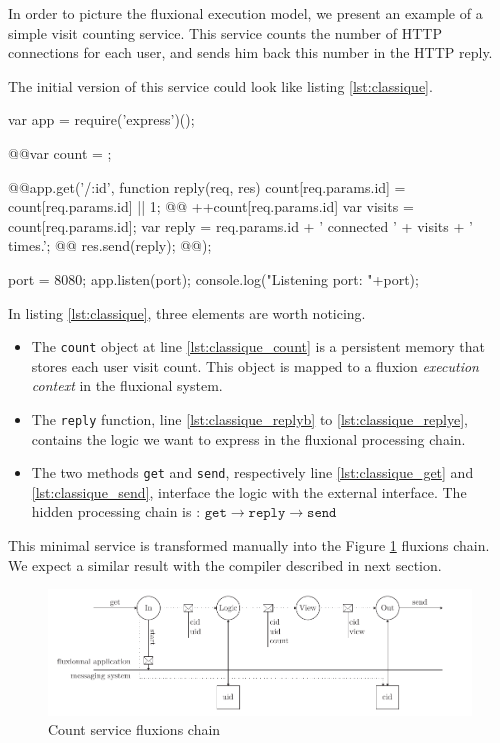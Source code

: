 In order to picture the fluxional execution model, we present an example of a simple visit counting service.
This service counts the number of HTTP connections for each user, and sends him back this number in the HTTP reply.

The initial version of this service could look like listing \ref{lst:classique}.

\begin{code}[Javascript, caption={Initial service},label={lst:classique}]
var app = require('express')();

@\label{lst:classique_count}@var count = {};

@\label{lst:classique_get}\label{lst:classique_replyb}@app.get('/:id', function reply(req, res){
  count[req.params.id] = count[req.params.id]  || 1; @\label{lst:classique_dynres}@
  ++count[req.params.id] 
  var visits = count[req.params.id];
  var reply = req.params.id + ' connected ' + visits + ' times.';
@\label{lst:classique_send}@  res.send(reply);
@\label{lst:classique_replye}@});

port = 8080;
app.listen(port);
console.log("Listening port: "+port);
\end{code}

In listing \ref{lst:classique}, three elements are worth noticing.

\begin{itemize}
  \item The \texttt{count} object at line \ref{lst:classique_count} is a persistent memory that stores each user visit count.
  This object is mapped to a fluxion \textit{execution context} in the fluxional system.
  \item The \texttt{reply} function, line \ref{lst:classique_replyb} to \ref{lst:classique_replye}, contains the logic we want to express in the fluxional processing chain.
  \item The two methods \texttt{get} and \texttt{send}, respectively line \ref{lst:classique_get} and \ref{lst:classique_send}, interface the logic with the external interface.
  The hidden processing chain is : $\texttt{get} \to \texttt{reply} \to \texttt{send}$
\end{itemize}

This minimal service is transformed manually into the Figure \ref{fig:fluxions} fluxions chain.
We expect a similar result with the compiler described in next section. 

\begin{figure}[h!]
  \includegraphics[width=\linewidth]{ressources/flux.pdf}
  \caption{Count service fluxions chain}
  \label{fig:fluxions}
\end{figure}

